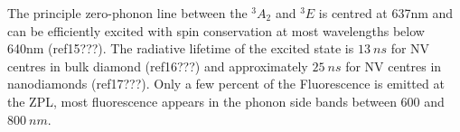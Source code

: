 \documentclass[prl]{revtex4}
\begin{document}
 
The principle zero-phonon line between the $^3A_2$ and $^3E$ is centred at 637nm and can be efficiently excited with spin conservation at most wavelengths below 640nm (ref15???). The radiative lifetime of the excited state is $\SI{13}{ns}$ for NV centres in bulk diamond (ref16???) and approximately $\SI{25}{ns}$ for NV centres in nanodiamonds (ref17???). Only a few percent of the Fluorescence is emitted at the ZPL, most fluorescence appears in the phonon side bands between 600 and $\SI{800}{nm}$.
\end{document}
